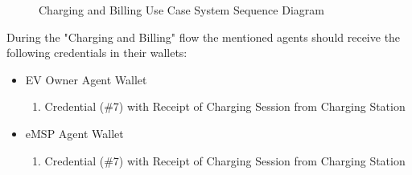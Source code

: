 \begin{figure}[!]
    \centering
    \caption{Charging and Billing Use Case System Sequence Diagram}
    \label{fig:charging_and_billing_ssd}
\end{figure}


During the "Charging and Billing" flow the mentioned agents should receive the following credentials in their wallets:

\begin{itemize}
    \item EV Owner Agent Wallet
    \begin{enumerate}
        \item Credential (\#7) with Receipt of Charging Session from Charging Station
    \end{enumerate}
    \item eMSP Agent Wallet
    \begin{enumerate}
        \item Credential (\#7) with Receipt of Charging Session from Charging Station
    \end{enumerate}
\end{itemize}
